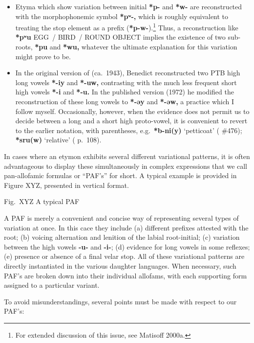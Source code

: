 \begin{itemize}
\item Etyma which show variation between initial \textbf{*p-} and \textbf{*w-} are reconstructed with
the morphophonemic symbol \textbf{*pʷ-,} which is roughly equivalent to treating the stop
element as a prefix (\textbf{*p-w-}).\footnote{For extended discussion of this issue,
see Matisoff 2000a.} Thus, a reconstruction like \textbf{*pʷu} EGG~/ BIRD~/ ROUND OBJECT
implies the existence of two sub-roots, \textbf{*pu} and \textbf{*wu,} whatever the ultimate
explanation for this variation might prove to be.

\item In the original version of \textit{} (ca.~1943), Benedict reconstructed two PTB high
long vowels \textbf{*-iy} and \textbf{*-uw,} contrasting with the much less frequent short high
vowels \textbf{*-i} and \textbf{*-u.}  In the published version (1972) he modified the
reconstruction of these long vowels to \textbf{*-əy} and \textbf{*-əw,} a practice which I follow
myself. Occasionally, however, when the evidence does not permit us to decide
between a long and a short high proto-vowel, it is convenient to revert to the
earlier notation, with parentheses, e.g.\ \textbf{*b-ni(y)} ‘petticoat’ (\textit{} \#476);
\textbf{*sru(w)} ‘relative’ (\textit{} p.~108).
\end{itemize}

In cases where an etymon exhibits several different variational patterns, it is often advantageous to display these simultaneously in complex expressions that we call pan-allofamic formulas or “PAF’s” for short. A typical example is provided in Figure XYZ, presented in vertical format.

						
				Fig.~XYZ A typical PAF

A PAF is merely a convenient and concise way of representing several types of variation at once. In this cace they include (a) different prefixes attested with the root; (b) voicing alternation and lenition of the labial root-initial; (c) variation between the high vowels \textbf{-u-} and \textbf{-i-}; (d) evidence for long vowels in some reflexes; (e) presence or absence of a final velar stop. All of these variational patterns are directly instantiated in the various daughter languages. When necessary, such PAF’s are broken down into their individual allofams, with each supporting form assigned to a particular variant.

To avoid misunderstandings, several points must be made with respect to our PAF’s:

